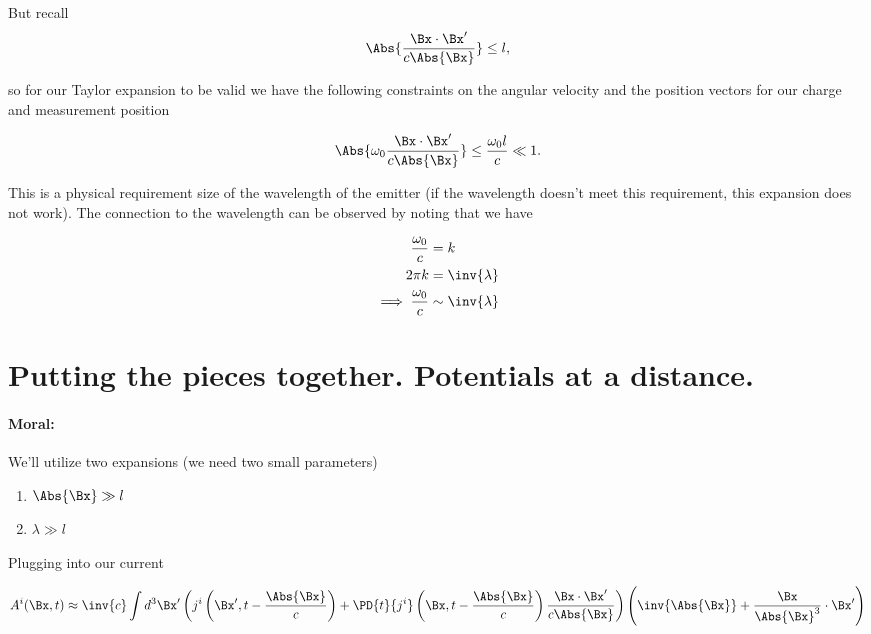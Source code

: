 But recall 
\begin{equation}\label{eqn:relativisticElectrodynamicsL20:130}
\Abs{\frac{\Bx \cdot \Bx'}{c \Abs{\Bx}}} \le l,
\end{equation}

so for our Taylor expansion to be valid we have the following constraints on the angular velocity and the position vectors for our charge and measurement position

\begin{equation}\label{eqn:relativisticElectrodynamicsL20:150}
\Abs{\omega_0 \frac{\Bx \cdot \Bx'}{c \Abs{\Bx}}} \le \frac{\omega_0 l}{c} \ll 1.
\end{equation}

This is a physical requirement size of the wavelength of the emitter (if the wavelength doesn't meet this requirement, this expansion does not work).  The connection to the wavelength can be observed by noting that we have

\begin{align*}
\frac{\omega_0}{c} &= k \\
2 \pi k &= \inv{\lambda} \\
\implies \frac{\omega_0}{c} &\sim \inv{\lambda} \\
\end{align*}

\section{Putting the pieces together.  Potentials at a distance.}

\paragraph{Moral:} We'll utilize two expansions (we need two small parameters)

\begin{enumerate}
\item $\Abs{\Bx} \gg l$
\item $\lambda \gg l$
\end{enumerate}

Plugging into our current

\begin{equation}\label{eqn:relativisticElectrodynamicsL20:190}
A^i(\Bx, t) 
\approx \inv{c} \int d^3 \Bx' 
\left( j^i\left(\Bx', t - \frac{\Abs{\Bx}}{c}\right) + \PD{t}{j^i} \left(\Bx, t - \frac{\Abs{\Bx}}{c}\right) \frac{\Bx \cdot \Bx'}{c \Abs{\Bx}} \right)
\left( \inv{\Abs{\Bx}} + \frac{\Bx}{\Abs{\Bx}^3} \cdot \Bx' \right)
\end{equation}

